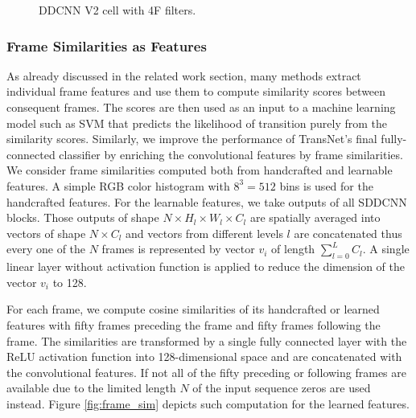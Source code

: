 \begin{figure}
    \caption[DDCNN V2 cell with 4F filters]{DDCNN V2 cell with 4F filters.}
    \label{fig:ddcnnv2}
\end{figure}

\subsubsection{Frame Similarities as Features}
As already discussed in the related work section, many methods extract individual frame features and use them to compute similarity scores between consequent frames. The scores are then used as an input to a machine learning model such as SVM that predicts the likelihood of transition purely from the similarity scores. Similarly, we improve the performance of TransNet's final fully-connected classifier by enriching the convolutional features by frame similarities. We consider frame similarities computed both from handcrafted and learnable features. A simple RGB color histogram with $8^3=512$ bins is used for the handcrafted features. For the learnable features, we take outputs of all SDDCNN blocks. Those outputs of shape $N\times H_l \times W_l \times C_l$ are spatially averaged into vectors of shape $N \times C_l$ and vectors from different levels $l$ are concatenated thus every one of the $N$ frames is represented by vector $v_i$ of length $\sum_{l=0}^L C_l$. A single linear layer without activation function is applied to reduce the dimension of the vector $v_i$ to 128.

For each frame, we compute cosine similarities of its handcrafted or learned features with fifty frames preceding the frame and fifty frames following the frame. The similarities are transformed by a single fully connected layer with the ReLU activation function into 128-dimensional space and are concatenated with the convolutional features. If not all of the fifty preceding or following frames are available due to the limited length $N$ of the input sequence zeros are used instead. Figure \ref{fig:frame_sim} depicts such computation for the learned features.

